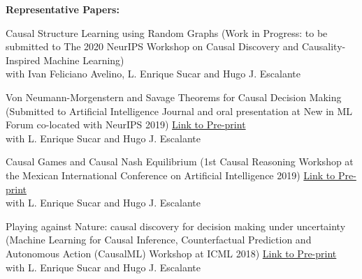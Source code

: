 \documentclass[acmsigecom]{acmtrans2m_nocategories}
\begin{document}
\vspace{3pt}
\noindent\textbf{Representative Papers:}
\begin{enumerate}[label={[\arabic*]}]
\item Causal Structure Learning using Random Graphs (Work in Progress: to be submitted to The 2020 NeurIPS Workshop on Causal Discovery and Causality-Inspired Machine Learning)\\
with Ivan Feliciano Avelino, L. Enrique Sucar and Hugo J. Escalante 
\item Von Neumann-Morgenstern and Savage Theorems for Causal Decision Making (Submitted to Artificial Intelligence Journal and oral presentation at New in ML Forum co-located with NeurIPS 2019) \href{https://arxiv.org/abs/1907.11752}{Link to Pre-print}\\
with L. Enrique Sucar and Hugo J. Escalante 
\item Causal Games and Causal Nash Equilibrium (1st Causal Reasoning Workshop at the Mexican International Conference on Artificial Intelligence 2019) \href{https://arxiv.org/abs/1910.06729}{Link to Pre-print}\\
with L. Enrique Sucar and Hugo J. Escalante 
\item Playing against Nature: causal discovery for decision making under uncertainty (Machine Learning for Causal Inference, Counterfactual Prediction and Autonomous Action (CausalML) Workshop at ICML 2018) \href{https://arxiv.org/abs/1807.01268}{Link to Pre-print}\\
with L. Enrique Sucar and Hugo J. Escalante 

\end{enumerate}


\printindex
\end{document}
